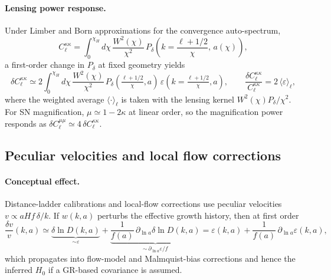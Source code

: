 \documentclass[11pt]{article}
\begin{document}
\paragraph{Lensing power response.}
Under Limber and Born approximations for the convergence auto-spectrum,
\begin{equation}
\label{eq:lensing-limber}
C_{\ell}^{\kappa\kappa}=\int_0^{\chi_H}\!\!d\chi\,\frac{W^2(\chi)}{\chi^2}\,
P_{\delta}\!\left(k=\frac{\ell+1/2}{\chi},\,a(\chi)\right),
\end{equation}
a first-order change in $P_{\delta}$ at fixed geometry yields
\begin{equation}
\label{eq:deltaCl-linear}
\delta C_{\ell}^{\kappa\kappa}
\simeq 2\!\int_0^{\chi_H}\!\!d\chi\,\frac{W^2(\chi)}{\chi^2}\,
P_{\delta}\!\left(\tfrac{\ell+1/2}{\chi},a\right)\,
\varepsilon\!\left(k=\tfrac{\ell+1/2}{\chi},a\right),
\qquad
\frac{\delta C_{\ell}^{\kappa\kappa}}{C_{\ell}^{\kappa\kappa}}
=2\,\big\langle\varepsilon\big\rangle_{\!\ell},
\end{equation}
where the weighted average $\langle\cdot\rangle_{\!\ell}$ is taken with the lensing kernel $W^2(\chi)P_{\delta}/\chi^2$. For SN magnification, $\mu\simeq 1-2\kappa$ at linear order, so the magnification power responds as $\delta C_{\ell}^{\mu\mu}\simeq 4\,\delta C_{\ell}^{\kappa\kappa}$.

\subsection{Peculiar velocities and local flow corrections}
\label{subsec:pv-ladder}

\paragraph{Conceptual effect.}
Distance-ladder calibrations and local-flow corrections use peculiar velocities $v\propto aHf\,\delta/k$. If $w(k,a)$ perturbs the effective growth history, then at first order
\begin{equation}
\label{eq:pv-linear}
\frac{\delta v}{v}(k,a)\simeq\underbrace{\delta\ln D(k,a)}_{\sim\varepsilon}
+\underbrace{\frac{1}{f(a)}\,\partial_{\ln a}\delta\ln D(k,a)}_{\sim\,\partial_{\ln a}\varepsilon/f}
=\varepsilon(k,a)+\frac{1}{f(a)}\,\partial_{\ln a}\varepsilon(k,a),
\end{equation}
which propagates into flow-model and Malmquist-bias corrections and hence the inferred $H_0$ if a GR-based covariance is assumed.
\end{document}
